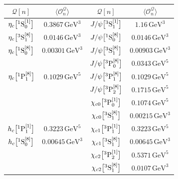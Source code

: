 \newpage
\vspace*{\fill}
\renewcommand*{\arraystretch}{1.4}
\begin{longtable}[t]{cc|cc}
\toprule
${\mathcal Q}[n]$ & $\langle \mathcal O_{n}^{\mathcal Q} \rangle$ 
&
${\mathcal Q}[n]$ & $\langle \mathcal O_{n}^{\mathcal Q} \rangle$ \\
\midrule\endhead
$\eta_c\big[{}^1\mathrm{S}_0^{[1]}\big]$ & $0.3867  \,\mathrm{GeV}^{3}$ & $J/\psi\big[{}^3\mathrm{S}_1^{[1]}\big]$ & $1.16    \,\mathrm{GeV}^{3}$ \\
$\eta_c\big[{}^3\mathrm{S}_1^{[8]}\big]$ & $0.0146  \,\mathrm{GeV}^{3}$ & $J/\psi\big[{}^1\mathrm{S}_0^{[8]}\big]$ & $0.0146  \,\mathrm{GeV}^{3}$ \\
$\eta_c\big[{}^1\mathrm{S}_0^{[8]}\big]$ & $0.00301 \,\mathrm{GeV}^{3}$ & $J/\psi\big[{}^3\mathrm{S}_1^{[8]}\big]$ & $0.00903 \,\mathrm{GeV}^{3}$ \\
                                     &                              &  
$J/\psi\big[{}^3\mathrm{P}_0^{[8]}\big]$ & $0.0343  \,\mathrm{GeV}^{5}$ \\
$\eta_c\big[{}^1\mathrm{P}_1^{[8]}\big]$ & $0.1029  \,\mathrm{GeV}^{5}$ & $J/\psi\big[{}^3\mathrm{P}_1^{[8]}\big]$ & $0.1029  \,\mathrm{GeV}^{5}$ \\
                                     &                              &  
$J/\psi\big[{}^3\mathrm{P}_2^{[8]}\big]$ & $0.1715  \,\mathrm{GeV}^{5}$ \\
\midrule
                                        &                              &  
$\chi_{c0}\big[{}^3\mathrm{P}_0^{[1]}\big]$ & $0.1074  \,\mathrm{GeV}^{5}$ \\
                                        &                              &  
$\chi_{c0}\big[{}^3\mathrm{S}_1^{[8]}\big]$ & $0.00215 \,\mathrm{GeV}^{3}$ \\
$h_c\big[{}^1\mathrm{P}_1^{[1]}\big]$       & $0.3223  \,\mathrm{GeV}^{5}$ & $\chi_{c1}\big[{}^3\mathrm{P}_1^{[1]}\big]$ & $0.3223  \,\mathrm{GeV}^{5}$ \\
$h_c\big[{}^1\mathrm{S}_0^{[8]}\big]$       & $0.00645 \,\mathrm{GeV}^{3}$ & $\chi_{c1}\big[{}^3\mathrm{S}_1^{[8]}\big]$ & $0.00645 \,\mathrm{GeV}^{3}$ \\
                                        &                              &  
$\chi_{c2}\big[{}^3\mathrm{P}_2^{[1]}\big]$ & $0.5371  \,\mathrm{GeV}^{5}$ \\
                                        &                              &  
$\chi_{c2}\big[{}^3\mathrm{S}_1^{[8]}\big]$ & $0.0107  \,\mathrm{GeV}^{3}$ \\

\end{longtable}
